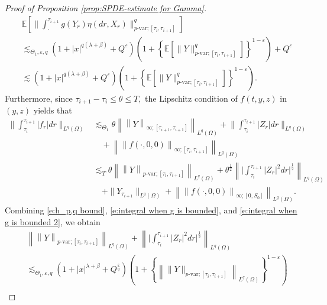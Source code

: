 \documentclass[11pt,reqno]{amsart}
\numberwithin{equation}{section}
\begin{document}
\begin{proof}[Proof of Proposition \ref{prop:SPDE-estimate for Gamma}]
\begin{equation}\label{e:integral when g is bounded}
\begin{aligned}
&\mathbb{E}\left[\Big\|\int_{\cdot}^{\tau_{i+1}}g(Y_{r})\eta(dr,X_{r})\Big\|^{q}_{p\text{-var};[\tau_{i},\tau_{i+1}]}\right]\\
&\lesssim_{\Theta_{1},\varepsilon,q}(1+|x|^{q(\lambda + \beta)}+Q^\varepsilon)\left(1+\left\{\mathbb{E}\left[\|Y\|^{q}_{p\text{-var};[\tau_{i},\tau_{i+1}]}\right]\right\}^{1-\varepsilon}\right) + Q^{\varepsilon}\\
&\lesssim (1+|x|^{q(\lambda + \beta)}+Q^\varepsilon) \left(1 + \left\{\mathbb{E}\left[\|Y\|^{q}_{p\text{-var};[\tau_{i},\tau_{i+1}]}\right]\right\}^{1-\varepsilon}\right).
\end{aligned}
\end{equation}
Furthermore, since $\tau_{i+1} - \tau_{i}\le \theta\le T,$ the Lipschitz condition of $f(t,y,z)$ in $(y,z)$ yields that
\begin{equation}\label{e:integral when g is bounded 2}
\begin{aligned}
\Big\|\int_{\tau_{i}}^{\tau_{i+1}}|f_{r}|dr\Big\|_{L^{q}(\Omega)}&\lesssim_{\Theta_{1}}  \theta\left\|\left\|Y\right\|_{\infty;[\tau_{i+1},\tau_{i+1}]}\right\|_{L^{q}(\Omega)} + \Big\|\int_{\tau_{i}}^{\tau_{i+1}}|Z_{r}|dr\Big\|_{L^{q}(\Omega)}\\
&\quad  + \left\|\left\|f(\cdot,0,0)\right\|_{\infty;[\tau_{i},\tau_{i+1}]}\right\|_{L^{q}(\Omega)}\\
&\lesssim_{T} \theta\left\|\left\|Y\right\|_{p\text{-var};[\tau_{i},\tau_{i+1}]}\right\|_{L^{q}(\Omega)} + \theta^{\frac{1}{2}}\left\|\Big|\int_{\tau_{i}}^{\tau_{i+1}}|Z_{r}|^{2}dr\Big|^{\frac{1}{2}}\right\|_{L^{q}(\Omega)}\\
&\quad + \|Y_{\tau_{i+1}}\|_{L^{q}(\Omega)} + \left\|\left\|f(\cdot,0,0)\right\|_{\infty;[0,S_{0}]}\right\|_{L^{q}(\Omega)}.
\end{aligned}
\end{equation}
Combining \eqref{e:h_p,q bound}, \eqref{e:integral when g is bounded}, and \eqref{e:integral when g is bounded 2}, we obtain
\begin{equation}\label{e:SPDE-Y^i}
\begin{aligned}
&\left\|\left\|Y\right\|_{p\text{-var};[\tau_{i},\tau_{i+1}]}\right\|_{L^{q}(\Omega)} + \left\|\Big|\int_{\tau_{i}}^{\tau_{i+1}}|Z_{r}|^{2}dr\Big|^{\frac{1}{2}}\right\|_{L^{q}(\Omega)}\\
&\lesssim_{\Theta_{1},\varepsilon,q} (1+|x|^{\lambda + \beta} + Q^{\frac{\varepsilon}{q}})\left(1 + \left\{\left\|\|Y\|_{p\text{-var};[\tau_{i},\tau_{i+1}]}\right\|_{L^{q}(\Omega)}\right\}^{1-\varepsilon}\right)\\

\end{aligned}
\end{equation}
\end{proof}
\end{document}
